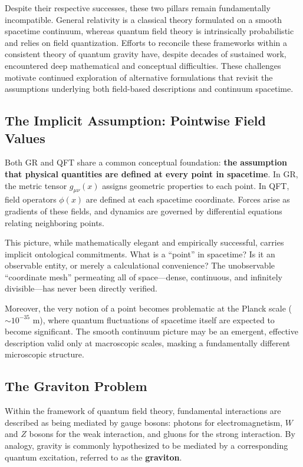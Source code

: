 \documentclass[12pt,letterpaper]{article}
\begin{document}
Despite their respective successes, these two pillars remain fundamentally incompatible. General relativity is a classical theory formulated on a smooth spacetime continuum, whereas quantum field theory is intrinsically probabilistic and relies on field quantization. Efforts to reconcile these frameworks within a consistent theory of quantum gravity have, despite decades of sustained work, encountered deep mathematical and conceptual difficulties. These challenges motivate continued exploration of alternative formulations that revisit the assumptions underlying both field-based descriptions and continuum spacetime.


\subsection{The Implicit Assumption: Pointwise Field Values}
\label{subsec:pointwise_fields}

Both GR and QFT share a common conceptual foundation: \textbf{the assumption that physical quantities are defined at every point in spacetime}. In GR, the metric tensor $g_{\mu\nu}(x)$ assigns geometric properties to each point. In QFT, field operators $\phi(x)$ are defined at each spacetime coordinate. Forces arise as gradients of these fields, and dynamics are governed by differential equations relating neighboring points.

This picture, while mathematically elegant and empirically successful, carries implicit ontological commitments. What is a ``point'' in spacetime? Is it an observable entity, or merely a calculational convenience? The unobservable ``coordinate mesh'' permeating all of space—dense, continuous, and infinitely divisible—has never been directly verified.

Moreover, the very notion of a point becomes problematic at the Planck scale ($\sim 10^{-35}$ m), where quantum fluctuations of spacetime itself are expected to become significant. The smooth continuum picture may be an emergent, effective description valid only at macroscopic scales, masking a fundamentally different microscopic structure.

\subsection{The Graviton Problem}
\label{subsec:graviton}

Within the framework of quantum field theory, fundamental interactions are described as being mediated by gauge bosons: photons for electromagnetism, $W$ and $Z$ bosons for the weak interaction, and gluons for the strong interaction. By analogy, gravity is commonly hypothesized to be mediated by a corresponding quantum excitation, referred to as the \textbf{graviton}.
\end{document}
